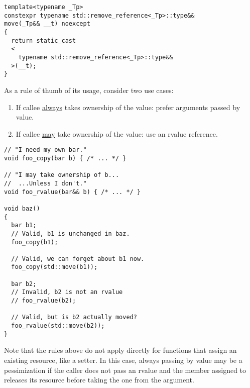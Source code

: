 \begin{lstlisting}
template<typename _Tp>
constexpr typename std::remove_reference<_Tp>::type&&
move(_Tp&& __t) noexcept
{
  return static_cast
  <
    typename std::remove_reference<_Tp>::type&&
  >(__t);
}
\end{lstlisting}

\begin{guideline}
  As a rule of thumb of its usage, consider two use cases:

  \begin{enumerate}
  \item If callee \underline{always} takes ownership of the value:
    prefer arguments passed by value.
  \item If callee \underline{may} take ownership of the value: use an
    rvalue reference.
  \end{enumerate}
\end{guideline}

\begin{lstlisting}
// "I need my own bar."
void foo_copy(bar b) { /* ... */ }

// "I may take ownership of b...
//  ...Unless I don't."
void foo_rvalue(bar&& b) { /* ... */ }

void baz()
{
  bar b1;
  // Valid, b1 is unchanged in baz.
  foo_copy(b1);

  // Valid, we can forget about b1 now.
  foo_copy(std::move(b1));

  bar b2;
  // Invalid, b2 is not an rvalue
  // foo_rvalue(b2);

  // Valid, but is b2 actually moved?
  foo_rvalue(std::move(b2));
}
\end{lstlisting}

Note that the rules above do not apply directly for functions that
assign an existing resource, like a setter. In this case, always
passing by value may be a pessimization if the caller does not pass an
rvalue and the member assigned to releases its resource before taking
the one from the argument.

